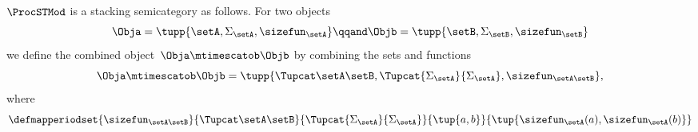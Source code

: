 \begin{lemma}
    $\ProcSTMod$ is a stacking semicategory as follows.
    For two objects
    \begin{equation}
        \Obja = \tupp{\setA, \Sigma_{\setA}, \sizefun_{\setA}}
        \qqand
        \Objb = \tupp{\setB, \Sigma_{\setB}, \sizefun_{\setB}}
    \end{equation}
    we define the combined object~$\Obja \mtimescatob \Objb$ by combining the sets and functions
    \begin{equation}
        \Obja \mtimescatob \Objb = \tupp{
            \Tupcat \setA \setB,
            \Tupcat {\Sigma_{\setA}} {\Sigma_{\setA}},
            \sizefun_{\setA\setB}
        },
    \end{equation}
    where
    \begin{equation}
        \defmapperiodset{
            \sizefun_{\setA\setB}
        }{
            \Tupcat \setA \setB
        }{
            \Tupcat {\Sigma_{\setA}} {\Sigma_{\setA}}
        }{
            \tup{a,b}
        }{
            \tup{
                \sizefun_{\setA}(a),
                \sizefun_{\setA}(b)
            }
        }
    \end{equation}


\end{lemma}
